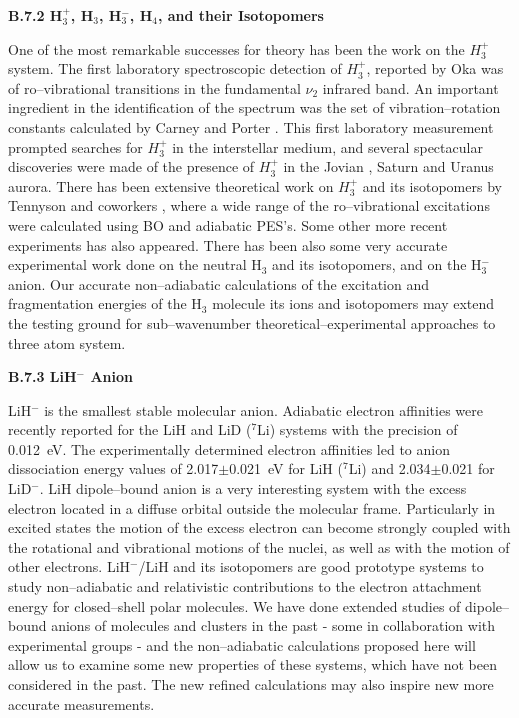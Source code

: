 \vspace{2mm}
\noindent
{\bf B.7.2 
H$_3^+$, H$_3$, H$_3^-$, H$_4$, and their Isotopomers}



One of the most remarkable successes
for theory has been the work on the $H_3^{+}$
system. The first laboratory spectroscopic detection of  $H_3^{+}$,
reported by Oka \cite{ref:k35} was of ro--vibrational transitions in the
fundamental $\nu_2$ infrared band. An important ingredient in the
identification of the spectrum was the set of vibration--rotation
constants calculated by Carney and Porter \cite{ref:k36}. This first
laboratory measurement prompted searches for $H_3^{+}$ in the interstellar
medium, and several spectacular discoveries were made of the presence
of $H_3^{+}$ in the Jovian \cite{ref:k41}, Saturn \cite{ref:k44} and
Uranus \cite{ref:k45} aurora. There has been 
extensive theoretical
work on $H_3^{+}$ and its isotopomers by Tennyson and coworkers
\cite{ref:ten2,ref:ten3,ref:ten4,ref:ten5,ref:ten6,ref:ten7,ref:ten8,%
ref:ten9}, where a wide range of the ro--vibrational excitations were
calculated using BO and adiabatic PES's. Some other
more recent experiments has also appeared.\cite{mccall,stark} 
There has been also some very accurate experimental work
done on the neutral H$_3$ and its 
isotopomers,\cite{azinovic,muller} and on the H$_3^-$ anion.\cite{rob}
Our accurate non--adiabatic calculations of the excitation
and fragmentation energies of the H$_3$ molecule its
ions and isotopomers may extend the testing ground for
sub--wavenumber theoretical--experimental approaches to 
three atom system.



\vspace{2mm}
\noindent
{\bf B.7.3
LiH$^-$ Anion}

LiH$^-$ is the smallest stable molecular anion.
Adiabatic electron affinities were recently reported for 
the LiH and LiD ($^7$Li) systems with the precision
of 0.012~eV.\cite{sarkas}
The experimentally determined electron affinities led to
anion dissociation energy values of 2.017$\pm$0.021~eV 
for LiH ($^7$Li)
and 2.034$\pm$0.021 for LiD$^-$.
LiH dipole--bound anion is a very interesting system
with the excess electron located in a diffuse orbital
outside the molecular frame. Particularly in excited
states the motion of the excess electron can become strongly
coupled with the rotational and vibrational motions
of the nuclei, as well as with the motion of other electrons.
LiH$^-$/LiH and its isotopomers are good prototype 
systems to study
non--adiabatic and relativistic contributions 
to the electron attachment energy for closed--shell polar
molecules. We have done extended studies of dipole--bound
anions of molecules and clusters in the past - some
in collaboration with experimental groups - and
the non--adiabatic calculations proposed here 
will allow us to examine some new properties of these 
systems, which have not been considered in the past. 
The new refined calculations may also inspire new more
accurate measurements.





